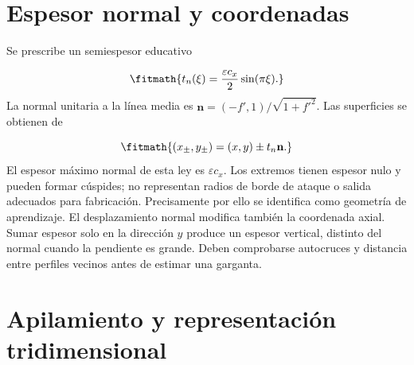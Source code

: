 \documentclass[10pt,openany]{book}
\begin{document}
\begin{minipage}{\linewidth}
{\begin{tikzpicture}
\end{tikzpicture}}%
\else
{}%
\fi
\fi
\endgroup
\par\nopagebreak
{}
\end{minipage}
\par\vspace{\baselineskip}

\section{Espesor normal y coordenadas}


Se prescribe un semiespesor educativo



\[
\fitmath{t_n(\xi)=\frac{\varepsilon c_x}{2}\sin(\pi\xi).}
\]
La normal unitaria a la línea media es \(\mathbf n=(-f',1)/\sqrt{1+f'^2}\). Las superficies se obtienen de

\[
\fitmath{(x_\pm,y_\pm)=(x,y)\pm t_n\mathbf n.}
\]
El espesor máximo normal de esta ley es \(\varepsilon c_x\). Los extremos tienen espesor nulo y pueden formar cúspides; no representan radios de borde de ataque o salida adecuados para fabricación. Precisamente por ello se identifica como geometría de aprendizaje.
El desplazamiento normal modifica también la coordenada axial. Sumar espesor solo en la dirección \(y\) produce un espesor vertical, distinto del normal cuando la pendiente es grande. Deben comprobarse autocruces y distancia entre perfiles vecinos antes de estimar una garganta.

\section{Apilamiento y representación tridimensional}
\end{document}
